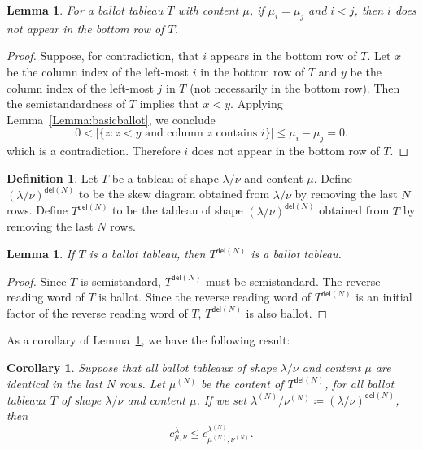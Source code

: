 \documentclass[10pt]{article}
\newtheorem{lemma}[theorem]{Lemma}
\newtheorem{coro}[theorem]{Corollary}
\theoremstyle{definition}
\newtheorem{defi}[theorem]{Definition}
\newcommand{\del}{\mathsf{del}}
\begin{document}
\begin{lemma}\label{Lemma:rowofT}
For a ballot tableau $T$ with content $\mu$, if $\mu_i= \mu_j$ and $i<j$, then $i$ does not appear in the bottom row of $T$.
\end{lemma}
\begin{proof}
Suppose, for contradiction, that $i$ appears in the bottom row of $T$. Let $x$ be the column index of the left-most $i$ in the bottom row of $T$ and $y$ be the column index of the left-most $j$ in $T$ (not necessarily in the bottom row). Then the semistandardness of $T$ implies that $x<y$. Applying Lemma~\ref{Lemma:basicballot}, we conclude
\[ 
0 < |\{ z : z < y\text{ and column $z$ contains $i$} \}| \leq \mu_i-\mu_j = 0.
\]
which is a contradiction. Therefore $i$ does not appear in the bottom row of $T$.
\end{proof}

\begin{defi} \label{def:skewbottomrowremoval} Let $T$ be a tableau of shape $\lambda / \nu$ and content $\mu$. Define $(\lambda/\nu)^{\del(N)}$ to be the skew diagram obtained from $\lambda/\nu$ by removing the last $N$ rows. Define $T^{\del (N)}$ to be the tableau of shape $(\lambda/\nu)^{\del (N)}$ obtained from $T$ by removing the last $N$ rows. 
\end{defi} 
\begin{lemma}\label{Lemma:rmvlastrow}
If $T$ is a ballot tableau, then $T^{\del (N)}$ is a ballot tableau. 
\end{lemma}
\begin{proof}
Since $T$ is semistandard, $T^{\del (N)}$ must be semistandard. The reverse reading word of $T$ is ballot. Since the reverse reading word of $T^{\del (N)}$ is an initial factor of the reverse reading word of $T$, $T^{\del (N)}$ is also ballot.
\end{proof}

As a corollary of Lemma~\ref{Lemma:rmvlastrow}, we have the following result:

\begin{coro}\label{Cor:rmvlastrow}
Suppose that all ballot tableaux of shape $\lambda/\nu$ and content $\mu$ are identical in the last $N$ rows. Let $\mu^{(N)}$ be the content of $T^{\del (N)}$, for all ballot tableaux $T$ of shape $\lambda/\nu$ and content $\mu$. If we set $\lambda^{(N)}/\nu^{(N)} \coloneqq (\lambda/\nu)^{\del (N)}$, then
\[
c^{\lambda}_{\mu,\nu}\leq c^{\lambda^{(N)}}_{\mu^{(N)},\nu^{(N)}}.
\]

\end{coro}
\end{document}
